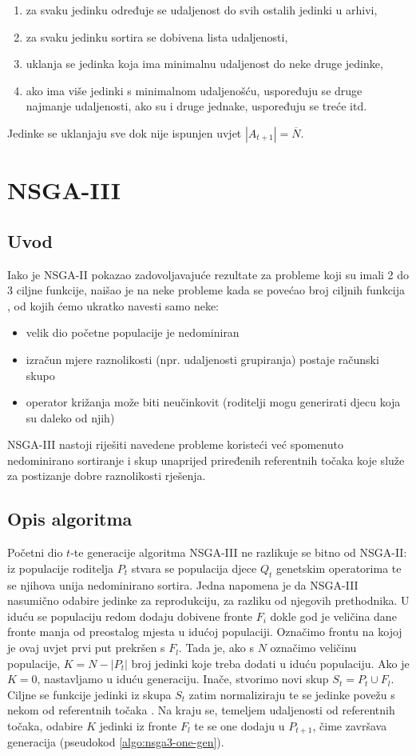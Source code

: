 \documentclass[times, utf8, zavrsni, numeric]{fer}
\begin{document}
\begin{enumerate}
\item za svaku jedinku određuje se udaljenost do svih ostalih jedinki u arhivi, 
\item za svaku jedinku sortira se dobivena lista udaljenosti,
\item uklanja se jedinka koja ima minimalnu udaljenost do neke druge jedinke,
\item ako ima više jedinki s minimalnom udaljenošću, uspoređuju se druge najmanje udaljenosti,
ako su i druge jednake, uspoređuju se treće itd.
\end{enumerate}
Jedinke se uklanjaju sve dok nije ispunjen uvjet $\left\vert A_{t+1} \right\vert = \overline{N}$.

\section{NSGA-III}
\subsection{Uvod}
Iako je NSGA-II pokazao zadovoljavajuće rezultate za probleme koji su imali 2 do 3 ciljne funkcije, naišao je na neke probleme kada se povećao broj ciljnih funkcija \citep{nsga3}, od kojih ćemo ukratko navesti samo neke:
\begin{itemize}
\item velik dio početne populacije je nedominiran
\item izračun mjere raznolikosti (npr. udaljenosti grupiranja) postaje računski skupo
\item operator križanja može biti neučinkovit (roditelji mogu generirati djecu koja su daleko od njih)
\end{itemize}  
NSGA-III nastoji riješiti navedene probleme koristeći već spomenuto nedominirano sortiranje i skup unaprijed priređenih referentnih točaka koje služe za postizanje dobre raznolikosti rješenja. 
\subsection{Opis algoritma}
Početni dio $t$-te generacije algoritma NSGA-III ne razlikuje se bitno od NSGA-II: iz populacije roditelja $P_t$ stvara se populacija djece $Q_t$ genetskim operatorima te se njihova unija nedominirano sortira. Jedna napomena je da NSGA-III nasumično odabire jedinke za reprodukciju, za razliku od njegovih prethodnika. U iduću se populaciju redom dodaju dobivene fronte $F_i$ dokle god je veličina dane fronte manja od preostalog mjesta u idućoj populaciji. Označimo frontu na kojoj je ovaj uvjet prvi put prekršen s $F_l$. Tada je, ako s $N$ označimo veličinu populacije, $K = N - \left\vert{P_t}\right\vert$ broj jedinki koje treba dodati u iduću populaciju. Ako je $K = 0$, nastavljamo u iduću generaciju. Inače, stvorimo novi skup $S_t = P_t \cup F_l$. Ciljne se funkcije jedinki iz skupa $S_t$ zatim normaliziraju te se jedinke povežu s nekom od referentnih točaka . Na kraju se, temeljem udaljenosti od referentnih točaka, odabire $K$ jedinki iz fronte $F_l$ te se one dodaju u $P_{t+1}$, čime završava generacija (pseudokod \ref{algo:nsga3-one-gen}). \\
\end{document}
